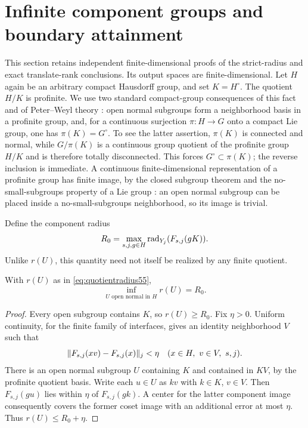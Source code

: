 \section{Infinite component groups and boundary attainment}\label{sec:profinite55}
This section retains independent finite-dimensional proofs of the strict-radius and exact translate-rank conclusions. Its output spaces are finite-dimensional. Let $H$ again be an arbitrary compact Hausdorff group, and set $K=H^\circ$. The quotient $H/K$ is profinite. We use two standard compact-group consequences of this fact and of Peter--Weyl theory \cite{Folland}: open normal subgroups form a neighborhood basis in a profinite group, and, for a continuous surjection $\pi:H\to G$ onto a compact Lie group, one has $\pi(K)=G^\circ$. To see the latter assertion, $\pi(K)$ is connected and normal, while $G/\pi(K)$ is a continuous group quotient of the profinite group $H/K$ and is therefore totally disconnected. This forces $G^\circ\subset\pi(K)$; the reverse inclusion is immediate. A continuous finite-dimensional representation of a profinite group has finite image, by the closed subgroup theorem and the no-small-subgroups property of a Lie group \cite{Hall}: an open normal subgroup can be placed inside a no-small-subgroups neighborhood, so its image is trivial.

Define the component radius
\begin{equation}\label{eq:R055}
                 R_0=\max_{s,j,g\in H}\operatorname{rad}_{Y_j}(F_{s,j}(gK)).
\end{equation}
Unlike $r(U)$, this quantity need not itself be realized by any finite quotient.

\begin{lemma}\label{lem:infradius55}
With $r(U)$ as in \eqref{eq:quotientradius55},
\[
                 \inf_{U\text{ open normal in }H}r(U)=R_0.
\]
\end{lemma}
\begin{proof}
Every open subgroup contains $K$, so $r(U)\ge R_0$. Fix $\eta>0$. Uniform continuity, for the finite family of interfaces, gives an identity neighborhood $V$ such that
\[
 \lVert F_{s,j}(xv)-F_{s,j}(x)\rVert_j<\eta
       \quad(x\in H,\ v\in V,\ s,j).
\]
There is an open normal subgroup $U$ containing $K$ and contained in $KV$, by the profinite quotient basis. Write each $u\in U$ as $kv$ with $k\in K$, $v\in V$. Then $F_{s,j}(gu)$ lies within $\eta$ of $F_{s,j}(gk)$. A center for the latter component image consequently covers the former coset image with an additional error at most $\eta$. Thus $r(U)\le R_0+\eta$.
\end{proof}


